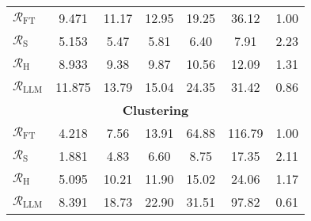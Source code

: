 \begin{table}[t]
\begin{tabular}{lcccccc}
$\mathcal{R}_\text{FT}$ & 9.471 & 11.17 & 12.95 & 19.25 & 36.12 & 1.00 \\ %
$\mathcal{R}_\text{S}$ & 5.153 & 5.47 & 5.81 & 6.40 & 7.91 & 2.23 \\ %
$\mathcal{R}_\text{H}$ & 8.933 & 9.38 & 9.87 & 10.56 & 12.09 & 1.31 \\ %
$\mathcal{R}_\text{LLM}$ & 11.875 & 13.79 & 15.04 & 24.35 & 31.42 & 0.86 \\ %
\multicolumn{7}{c}{\textbf{Clustering}} \\  %
$\mathcal{R}_\text{FT}$ & 4.218 & 7.56 & 13.91 & 64.88 & 116.79 & 1.00 \\ %
$\mathcal{R}_\text{S}$ & 1.881 & 4.83 & 6.60 & 8.75 & 17.35 & 2.11 \\ %
$\mathcal{R}_\text{H}$ & 5.095 & 10.21 & 11.90 & 15.02 & 24.06 & 1.17 \\ %
$\mathcal{R}_\text{LLM}$ & 8.391 & 18.73 & 22.90 & 31.51 & 97.82 & 0.61 \\ %
\bottomrule
\end{tabular}
\vspace{-2mm} %
\end{table}
